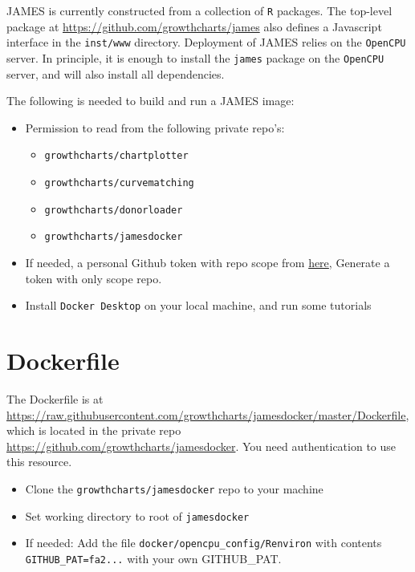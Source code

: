 \documentclass[
]{book}
\providecommand{\tightlist}{%
  \setlength{\itemsep}{0pt}\setlength{\parskip}{0pt}}
\begin{document}
JAMES is currently constructed from a collection of \texttt{R} packages. The top-level package at \url{https://github.com/growthcharts/james} also defines a Javascript interface in the \texttt{inst/www} directory. Deployment of JAMES relies on the \texttt{OpenCPU} server. In principle, it is enough to install the \texttt{james} package on the \texttt{OpenCPU} server, and will also install all dependencies.

The following is needed to build and run a JAMES image:

\begin{itemize}
\item
  Permission to read from the following private repo's:

  \begin{itemize}
  \tightlist
  \item
    \texttt{growthcharts/chartplotter}
  \item
    \texttt{growthcharts/curvematching}
  \item
    \texttt{growthcharts/donorloader}
  \item
    \texttt{growthcharts/jamesdocker}
  \end{itemize}
\item
  If needed, a personal Github token with repo scope from \href{https://help.github.com/en/github/authenticating-to-github/creating-a-personal-access-token-for-the-command-line}{here}, Generate a token with only scope repo.
\item
  Install \texttt{Docker\ Desktop} on your local machine, and run some tutorials
\end{itemize}

\hypertarget{dockerfile}{%
\section{Dockerfile}\label{dockerfile}}

The Dockerfile is at \url{https://raw.githubusercontent.com/growthcharts/jamesdocker/master/Dockerfile}, which is located in the private repo \url{https://github.com/growthcharts/jamesdocker}. You need authentication to use this resource.

\begin{itemize}
\tightlist
\item
  Clone the \texttt{growthcharts/jamesdocker} repo to your machine
\item
  Set working directory to root of \texttt{jamesdocker}
\item
  If needed: Add the file \texttt{docker/opencpu\_config/Renviron} with contents \texttt{GITHUB\_PAT=fa2...} with your own GITHUB\_PAT.
\end{itemize}
\end{document}
